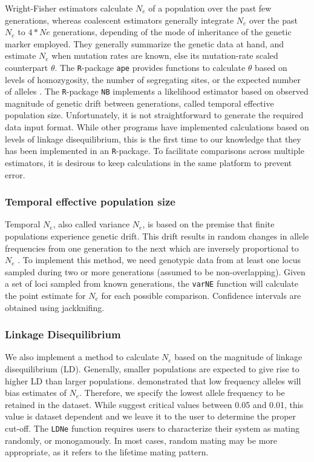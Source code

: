 \documentclass[english,titlepage]{article}
\begin{document}
Wright-Fisher estimators calculate $N_e$ of a population over the past few generations, whereas coalescent estimators generally integrate $N_e$ over the past $N_e$ to $4*Ne$ generations, depending of the mode of inheritance of the genetic marker employed. They generally summarize the genetic data at hand, and estimate $N_e$ when mutation rates are known, else its mutation-rate scaled counterpart $\theta$. The \texttt{R}-package \texttt{ape} provides functions to calculate $\theta$ based on levels of homozygosity, the number of segregating sites, or the expected number of alleles \citep{Paradis2004}. The \texttt{R}-package \texttt{NB} implements a likelihood estimator based on observed magnitude of genetic drift between generations, called temporal effective population size. Unfortunately, it is not straightforward to generate the required data input format. While other programs have implemented calculations based on levels of linkage disequilibrium, this is the first time to our knowledge that they has been implemented in an \texttt{R}-package. To facilitate comparisons across multiple estimators, it is desirous to keep calculations in the same platform to prevent error.

\subsubsection*{Temporal effective population size}

Temporal $N_e$, also called variance $N_e$, is based on the premise that finite populations experience genetic drift. This drift results in random changes in allele frequencies from one generation to the next which are inversely proportional to $N_e$ \citep{Nei1981}. To implement this method, we need genotypic data from at least one locus sampled during two or more generations (assumed to be non-overlapping).  Given a set of loci sampled from known generations, the \texttt{varNE} function will calculate the point estimate for $N_e$ for each possible comparison. Confidence intervals are obtained using jackknifing. 

\subsubsection*{Linkage Disequilibrium}

We also implement a method to calculate $N_e$ based on the magnitude of linkage disequilibrium (LD). Generally, smaller populations are expected to give rise to higher LD than larger populations. 
\cite{Waples2006} demonstrated that low frequency alleles will bias estimates of $N_e$. Therefore, we specify the lowest allele frequency to be retained in the dataset.  While \cite{Waples2008} suggest critical values between 0.05 and 0.01, this value is dataset dependent and we leave it to the user to determine the proper cut-off. The \texttt{LDNe} function requires users to characterize their system as mating randomly, or monogamously. In most cases, random mating may be more appropriate, as it refers to the lifetime mating pattern. 
\end{document}
